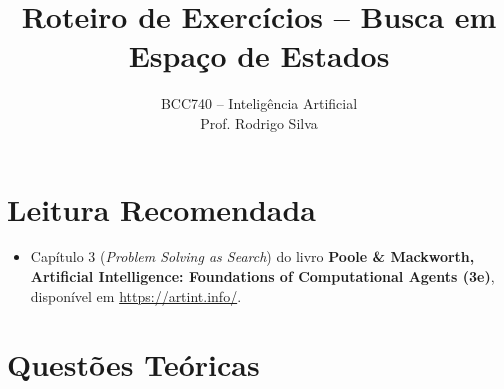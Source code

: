 \documentclass[9pt,a4paper]{extarticle}
\title{Roteiro de Exercícios -- Busca em Espaço de Estados}
\author{BCC740 -- Inteligência Artificial \\ Prof. Rodrigo Silva}
\date{}
\begin{document}
\maketitle

\section*{Leitura Recomendada}
\begin{itemize}
  \item Capítulo 3 (\textit{Problem Solving as Search}) do livro \textbf{Poole \& Mackworth, Artificial Intelligence: Foundations of Computational Agents (3e)}, disponível em \url{https://artint.info/}.
\end{itemize}

\section{Questões Teóricas}
\end{document}
